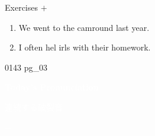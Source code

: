 \documentclass[aspectratio=169,xcolor={dvipsnames,table}]{beamer}
\begin{document}
\begin{frame}[plain]{Exercises  $+$ }
  \Large
  \begin{enumerate}
    \item<2-> We went to the camround last year.
    \item<4-> I often hel  irls with their homework.
  \end{enumerate}

  \hfill{\tiny 0143}\,{\scriptsize {}\,pg\_03}

\end{frame}
\begin{frame}
  \hypertarget{today}{}
  \centering
  \textcolor{white}{\Huge\bfseries Today's Pronunciation}

  \vspace{30pt}

  \textcolor{white}{\Large 連続する破裂音}

  \textcolor{white}{\Large {} $+$ }
\end{frame}
\end{document}
